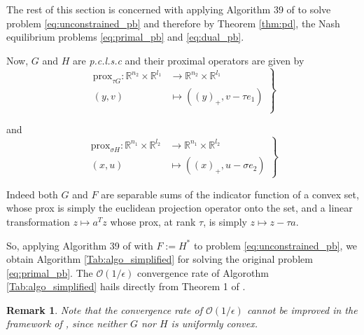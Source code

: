 \documentclass{article} %
\newtheorem{remark}{Remark}
\begin{document}
The rest of this section is concerned with applying Algorithm 39 of \cite{chambolle2010} to solve problem
\eqref{eq:unconstrained_pb} and therefore by Theorem \ref{thm:pd}, the Nash equilibrium problems \eqref{eq:primal_pb} and \eqref{eq:dual_pb}.

Now,
$G$ and $H$ are \textit{p.c.l.s.c} and their proximal operators are given by
  \begin{equation}
    \left .
    \begin{split}
      \text{prox}_{\tau G} : \mathbb{R}^{n_2} \times \mathbb{R}^{l_1} &\rightarrow \mathbb{R}^{n_2} \times \mathbb{R}^{l_1}\\
      (y, v) &\mapsto ((y)_+, v - \tau e_1)\\
    \end{split}
    \right\}
  \end{equation}

  and
  \begin{equation}
    \left .
    \begin{split}
      \text{prox}_{\sigma H}: \mathbb{R}^{n_1} \times \mathbb{R}^{l_2} &\rightarrow \mathbb{R}^{n_1} \times \mathbb{R}^{l_2}\\
      (x, u) &\mapsto ((x)_+, u - \sigma e_2)
    \end{split}
    \right\}
  \end{equation}

Indeed both $G$ and $F$ are separable sums of the indicator function of a convex set, whose prox is simply the euclidean projection operator onto the set,  and a linear transformation $z \mapsto a^Tz$ whose prox, at rank $\tau$, is simply $z \mapsto z - \tau a$.

So, applying Algorithm 39 of \cite{chambolle2010} with $F := H^*$
 to problem \eqref{eq:unconstrained_pb}, we obtain Algorithm \ref{Tab:algo_simplified} for solving the original problem \eqref{eq:primal_pb}. The $\mathcal{O}(1/\epsilon)$ convergence rate of Algorothm \ref{Tab:algo_simplified} hails directly from Theorem 1 of \cite{chambolle2010}.
\begin{remark}
  Note that the convergence rate of $\mathcal{O}(1/\epsilon)$ cannot be improved in the framework of \cite{chambolle2010}, since neither $G$ nor $H$ is \textit{uniformly convex}.
\end{remark}

\end{document}
